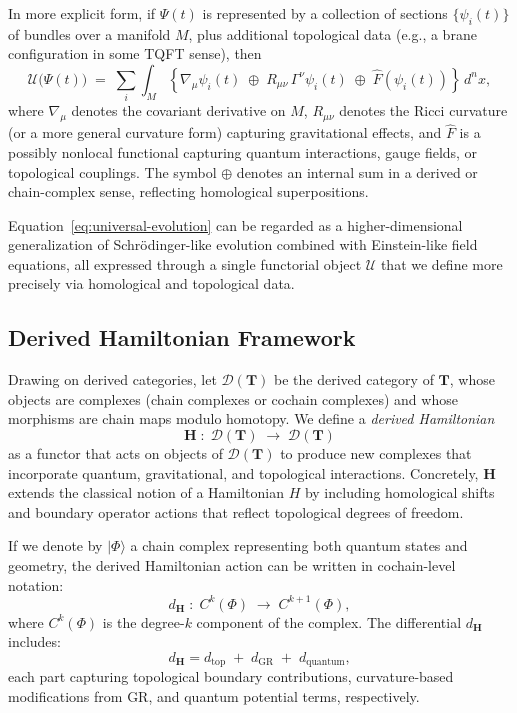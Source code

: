 \documentclass[11pt]{article}
\begin{document}
In more explicit form, if $\Psi(t)$ is represented by a collection of sections $\{\psi_i(t)\}$ of bundles over a manifold $M$, plus additional topological data (e.g., a brane configuration in some TQFT sense), then 
\begin{equation}
\label{eq:universal-u}
\mathcal{U}\bigl(\Psi(t)\bigr) \;=\; 
\sum_i 
\int_{M} 
\left\{
  \nabla_{\mu} \psi_i(t) \;\oplus\; 
  R_{\mu\nu} \,\Gamma^\nu \psi_i(t) \;\oplus\; 
  \widehat{F}(\psi_i(t))
\right\}\, d^nx,
\end{equation}
where $\nabla_{\mu}$ denotes the covariant derivative on $M$, $R_{\mu\nu}$ denotes the Ricci curvature (or a more general curvature form) capturing gravitational effects, and $\widehat{F}$ is a possibly nonlocal functional capturing quantum interactions, gauge fields, or topological couplings. The symbol $\oplus$ denotes an internal sum in a derived or chain-complex sense, reflecting homological superpositions. 

Equation~\eqref{eq:universal-evolution} can be regarded as a higher-dimensional generalization of Schr\"odinger-like evolution combined with Einstein-like field equations, all expressed through a single functorial object $\mathcal{U}$ that we define more precisely via homological and topological data. 

\subsection{Derived Hamiltonian Framework}

Drawing on derived categories, let $\mathcal{D}(\mathbf{T})$ be the derived category of $\mathbf{T}$, whose objects are complexes (chain complexes or cochain complexes) and whose morphisms are chain maps modulo homotopy. We define a \emph{derived Hamiltonian}
\begin{equation}
\label{eq:derived-H}
\mathbf{H} \;:\; \mathcal{D}(\mathbf{T}) \;\longrightarrow\; \mathcal{D}(\mathbf{T})
\end{equation}
as a functor that acts on objects of $\mathcal{D}(\mathbf{T})$ to produce new complexes that incorporate quantum, gravitational, and topological interactions. Concretely, $\mathbf{H}$ extends the classical notion of a Hamiltonian $H$ by including homological shifts and boundary operator actions that reflect topological degrees of freedom.

If we denote by $|\Phi\rangle$ a chain complex representing both quantum states and geometry, the derived Hamiltonian action can be written in cochain-level notation:
\begin{equation}
\label{eq:chain-level-H}
d_{\mathbf{H}} \;:\; C^k(\Phi) \;\longrightarrow\; C^{k+1}(\Phi),
\end{equation}
where $C^k(\Phi)$ is the degree-$k$ component of the complex. The differential $d_{\mathbf{H}}$ includes:
\[
d_{\mathbf{H}} = d_{\text{top}} \;+\; d_{\text{GR}} \;+\; d_{\text{quantum}},
\]
each part capturing topological boundary contributions, curvature-based modifications from GR, and quantum potential terms, respectively.
\end{document}
